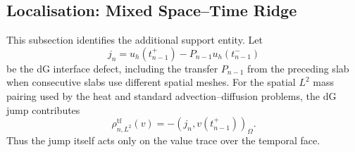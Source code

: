 

\subsection{Localisation: Mixed Space--Time Ridge}
\label{sec:bbm-mixed-ridge-specialisation}

This subsection identifies the additional support entity. 
Let
\begin{equation}
  j_n=u_h(t_{n-1}^{+})-P_{n-1}u_h(t_{n-1}^{-})
  \label{eq:bbm-discrete-jump}
\end{equation}
be the dG interface defect, including the transfer $P_{n-1}$ from the preceding slab when consecutive slabs use different spatial meshes. For the spatial $L^2$ mass pairing used by the heat and standard advection--diffusion problems, the dG jump contributes
\begin{equation}
  \rho_{n,L^2}^{\mathrm{tf}}(v)=-(j_n,v(t_{n-1}^{+}))_\Omega.
  \label{eq:bbm-l2-interface-contrast}
\end{equation}
Thus the jump itself acts only on the value trace over the temporal face.


